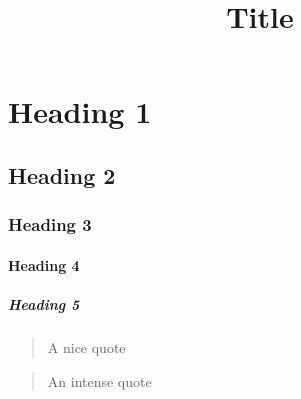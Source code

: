 \documentclass{article}
\title{Title}
\begin{document}
\section{Heading 1}







\subsection{Heading 2}







\subsubsection{Heading 3}







\paragraph{Heading 4}







\subparagraph{Heading 5}









\begin{quote}
  A nice quote
\end{quote}



\begin{quote}
  An intense quote
\end{quote}
\end{document}
